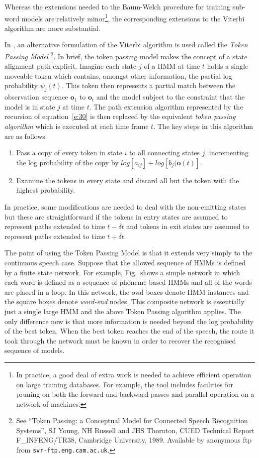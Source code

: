 Whereas the extensions needed to the Baum-Welch procedure for
training sub-word models are relatively minor\footnote{
In practice, a good deal of extra work is needed to achieve
efficient operation on large training databases.  For example,
the  tool includes facilities for
pruning on both the forward and backward passes and 
parallel operation on a network of machines.}, the corresponding
extensions to the Viterbi algorithm are more substantial.

In \HTK, an alternative formulation of the Viterbi algorithm is
used called the {\it Token Passing Model} \footnote{
See ``Token Passing: a Conceptual Model for Connected Speech
Recognition Systems'', SJ Young, NH Russell and JHS Thornton,
CUED Technical Report F\_INFENG/TR38, Cambridge University, 1989.
Available by anonymous ftp from \texttt{svr-ftp.eng.cam.ac.uk}.}.  
In brief,
the token passing model makes the concept of a state alignment
path explicit.  Imagine each state $j$ of a HMM at time $t$ holds a single
moveable token which contains, amongst other information,
the partial log probability $\psi_j(t)$.  This token then represents
a partial match between the observation sequence $\bm{o}_1$ to
$\bm{o}_t$ and the model subject to the constraint that the model
is in state $j$ at time $t$.  The path extension algorithm represented
by the recursion of equation~\ref{e:30} is then replaced by the
equivalent {\it token passing algorithm} which is
executed at each time frame $t$.  The key steps in this algorithm
are as follows
\begin{enumerate}
\item Pass a copy of every token in state $i$ 
      to all connecting states $j$, incrementing the log probability
      of the copy by $log[a_{ij}]+log[b_j(\bm{o}(t)]$.
\item Examine the tokens in every state and discard all but
      the token with the highest probability.
\end{enumerate}
In practice, some modifications are needed to deal with the non-emitting
states but these are straightforward  if the tokens in entry
states are assumed to represent paths extended to time $t-\delta t$
and tokens in exit
states are assumed to represent paths extended to time $t+\delta t$.

The point of using the Token Passing Model is that it extends
very simply to the continuous speech case.  Suppose that the
allowed sequence of HMMs is defined by a finite state network.
For example, Fig.~\href{f:netforcsr} shows a simple network in
which each word is defined as a sequence of phoneme-based HMMs
and all of the words are placed in a loop. 
In this network, the oval boxes denote HMM 
instances and the square
boxes denote \textit{word-end} nodes. This composite
network is essentially just a single large HMM and the above
Token Passing algorithm applies.  The only difference now is that
more information is needed beyond the log probability of the best
token.  When the best token reaches the end of the speech,
the route it took through the network must be known in order 
to recover the recognised sequence of models.

